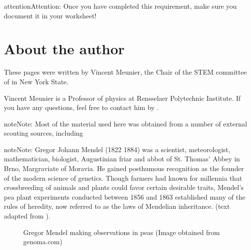 \documentclass[letterpaper,10pt,english,openany,oneside]{sphinxmanual}
\let\sphinxpxdimen\pdfpxdimen\else\newdimen\sphinxpxdimen
\begin{document}
\begin{sphinxadmonition}{attention}{Attention:}
Once you have completed this requirement, make sure you document it in your worksheet!
\end{sphinxadmonition}


\chapter{About the author}
\label{\detokenize{contact:about-the-author}}\label{\detokenize{contact::doc}}
These pages were written by Vincent Meunier, the Chair of the STEM committee of  in New York State.

Vincent Meunier is a Professor of physics at Rensselaer Polytechnic Institute. If you have any questions, feel free to contact him by .

\begin{sphinxadmonition}{note}{Note:}
Most of the material used here was obtained from a number of external scouting sources, including 
\end{sphinxadmonition}

\begin{sphinxadmonition}{note}{Note:}
Gregor Johann Mendel (1822 \textendash{} 1884) was a scientist, meteorologist, mathematician, biologist, Augustinian friar and abbot of St. Thomas’ Abbey in Brno, Margraviate of Moravia. He gained posthumous recognition as the founder of the modern science of genetics. Though farmers had known for millennia that crossbreeding of animals and plants could favor certain desirable traits, Mendel’s pea plant experiments conducted between 1856 and 1863 established many of the rules of heredity, now referred to as the laws of Mendelian inheritance. (text adapted from ).

\begin{figure}[H]
\centering
\capstart

\noindent\sphinxincludegraphics[width=400\sphinxpxdimen]{{gregor-mendel}.jpg}
\caption{Gregor Mendel making observations in peas (Image obtained from genoma.com)}\label{\detokenize{index:id1}}\end{figure}
\end{sphinxadmonition}



\renewcommand{\indexname}{Index}
\printindex
\end{document}
